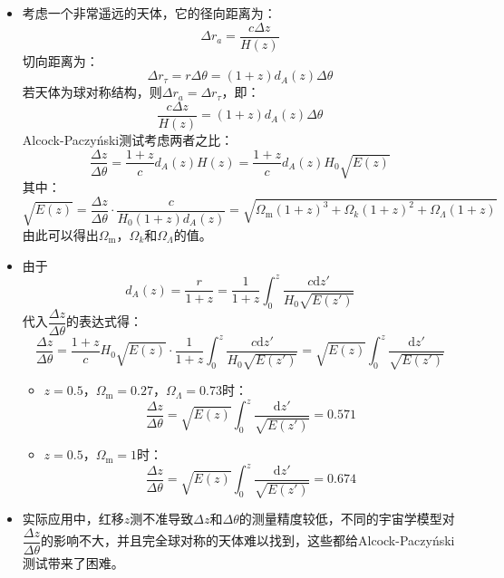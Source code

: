 \documentclass[a4paper,fontset=none]{ctexart}
\begin{document}
\begin{itemize}
    \item[2.(a)]
    考虑一个非常遥远的天体，它的径向距离为：
    \[
    \Delta r_a = \frac{c\Delta z}{H(z)}
    \]
    切向距离为：
    \[
    \Delta r_\tau = r\Delta\theta = (1+z)d_A(z)\Delta\theta
    \]
    若天体为球对称结构，则$\Delta r_a=\Delta r_\tau$，即：
    \[
    \frac{c\Delta z}{H(z)} = (1+z)d_A(z)\Delta\theta
    \]
    Alcock-Paczy\'{n}ski测试考虑两者之比：
    \[
       \frac{\Delta z}{\Delta\theta} = \frac{1+z}{c}d_A(z)H(z) = \frac{1+z}{c}d_A(z)H_0\sqrt{E(z)}
    \]
    其中：
    \[
    \sqrt{E(z)} = \frac{\Delta z}{\Delta\theta}\cdot\frac{c}{H_0(1+z)d_A(z)} = \sqrt{\Omega_\mathrm{m}(1+z)^{3}+\Omega_k(1+z)^{2}+\Omega_\Lambda(1+z)}
    \]
    由此可以得出$\Omega_\mathrm{m}$，$\Omega_k$和$\Omega_\Lambda$的值。

    \item[2.(b)]
    由于
    \[
    d_A(z) = \frac{r}{1+z} = \frac{1}{1+z}\int_0^z\frac{c\mathrm{d}z'}{H_0\sqrt{E(z')}}
    \]
    代入$\dfrac{\Delta z}{\Delta\theta}$的表达式得：
    \[
    \frac{\Delta z}{\Delta\theta} = \frac{1+z}{c}H_0\sqrt{E(z)}\cdot\frac{1}{1+z}\int_0^z\frac{c\mathrm{d}z'}{H_0\sqrt{E(z')}} = \sqrt{E(z)}\int_0^z\frac{\mathrm{d}z'}{\sqrt{E(z')}}
    \]
    \begin{itemize}
        \item[$\bullet$] $z=0.5$，$\Omega_\mathrm{m}=0.27$，$\Omega_\Lambda=0.73$时：
        \[
    \frac{\Delta z}{\Delta\theta}=\sqrt{E(z)}\int_0^z\frac{\mathrm{d}z'}{\sqrt{E(z')}}=0.571
        \]

        \item[$\bullet$] $z=0.5$，$\Omega_\mathrm{m}=1$时：
        \[
    \frac{\Delta z}{\Delta\theta}=\sqrt{E(z)}\int_0^z\frac{\mathrm{d}z'}{\sqrt{E(z')}}=0.674
        \]
    \end{itemize}

    \item[2.(c)]
    实际应用中，红移$z$测不准导致$\Delta z$和$\Delta\theta$的测量精度较低，不同的宇宙学模型对$\dfrac{\Delta z}{\Delta\theta}$的影响不大，并且完全球对称的天体难以找到，这些都给Alcock-Paczy\'{n}ski测试带来了困难。
\end{itemize}
\end{document}

